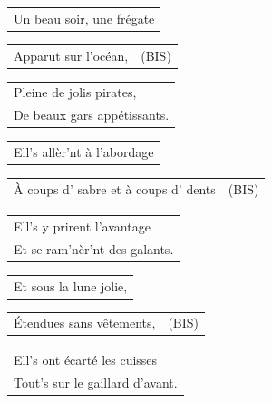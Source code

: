 \documentclass[a4paper, 14pt]{extarticle}
\begin{document}
\begin{flushleft}
\begin{tabularx}{\textwidth} {
    >{\raggedright\arraybackslash}X}
Un beau soir, une frégate\\
\end{tabularx}
\begin{tabularx}{\textwidth} {
    >{\raggedright\arraybackslash}X|c}
Apparut sur l’océan, & (BIS)\\
\end{tabularx}
\begin{tabularx}{\textwidth} {
    >{\raggedright\arraybackslash}X}
Pleine de jolis pirates, \\
De beaux gars appétissants.\\
\end{tabularx}
\end{flushleft}
\begin{flushleft}
\begin{tabularx}{\textwidth} {
    >{\raggedright\arraybackslash}X}
Ell’s allèr’nt à l’abordage\\
\end{tabularx}
\begin{tabularx}{\textwidth} {
    >{\raggedright\arraybackslash}X|c}
À coups d’ sabre et à coups d’ dents & (BIS)\\
\end{tabularx}
\begin{tabularx}{\textwidth} {
    >{\raggedright\arraybackslash}X}
Ell’s y prirent l’avantage \\
Et se ram’nèr’nt des galants.\\
\end{tabularx}
\end{flushleft}
\begin{flushleft}
\begin{tabularx}{\textwidth} {
    >{\raggedright\arraybackslash}X}
Et sous la lune jolie,\\
\end{tabularx}
\begin{tabularx}{\textwidth} {
    >{\raggedright\arraybackslash}X|c}
Étendues sans vêtements, & (BIS)\\
\end{tabularx}
\begin{tabularx}{\textwidth} {
    >{\raggedright\arraybackslash}X}
Ell’s ont écarté les cuisses\\
Tout’s sur le gaillard d’avant.\\
\end{tabularx}
\end{flushleft}
\end{document}
